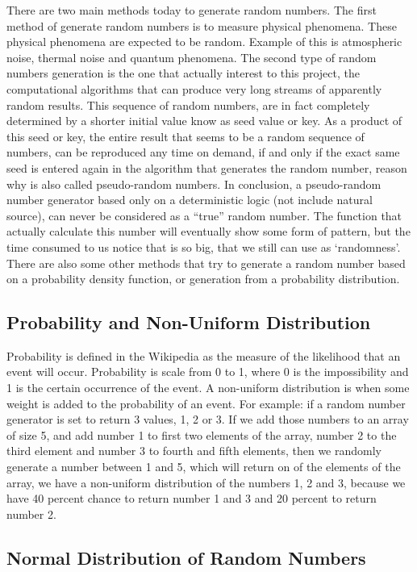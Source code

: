 \documentclass[a4paper,12pt]{book}
\begin{document}
There are two main methods today to generate random numbers. The first method of generate random numbers is to measure physical phenomena. These physical phenomena are expected to be random. Example of this is atmospheric noise, thermal noise and quantum phenomena. 
The second type of random numbers generation is the one that actually interest to this project, the computational algorithms that can produce very long streams of apparently random results. This sequence of random numbers, are in fact completely determined by a shorter initial value know as seed value or key.
As a product of this seed or key, the entire result that seems to be a random sequence of numbers, can be reproduced any time on demand, if and only if the exact same seed is entered again in the algorithm that generates the random number, reason why is also called pseudo-random numbers.
In conclusion, a pseudo-random number generator based only on a deterministic logic (not include natural source), can never be considered as a “true” random number. The function that actually calculate this number will eventually show some form of pattern, but the time consumed to us notice that is so big, that we still can use as ‘randomness’.
There are also some other methods that try to generate a random number based on a probability density function, or generation from a probability distribution.


\subsection{Probability and Non-Uniform Distribution}

Probability is defined in the Wikipedia as the measure of the likelihood that an event will occur. Probability is scale from 0 to 1, where 0 is the impossibility and 1 is the certain occurrence of the event.
A non-uniform distribution is when some weight is added to the probability of an event. For example: if a random number generator is set to return 3 values, 1, 2 or 3. If we add those numbers to an array of size 5, and add number 1 to first two elements of the array, number 2 to the third element and number 3 to fourth and fifth elements, then we randomly generate a number between 1 and 5, which will return on of the elements of the array, we have a non-uniform distribution of the numbers 1, 2 and 3, because we have 40 percent chance to return number 1 and 3 and 20 percent to return number 2.

\subsection{Normal Distribution of Random Numbers}
\end{document}
